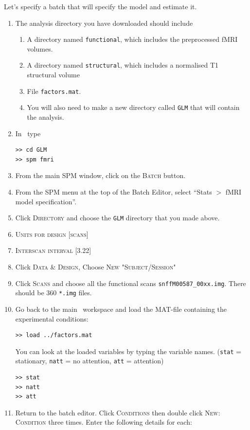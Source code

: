 Let's specify a batch that will specify the model and estimate it.

\begin{enumerate}
 \item The analysis directory you have downloaded should include
 \begin{enumerate}
  \item A directory named \texttt{functional}, which includes the preprocessed fMRI volumes.
  \item A directory named \texttt{structural}, which includes a normalised T1 structural volume
  \item File \texttt{factors.mat}.
  \item You will also need to make a new directory called \texttt{GLM} that will contain the analysis.
 \end{enumerate}
 \item In \matlab\ type
\begin{verbatim}
>> cd GLM
>> spm fmri
\end{verbatim}
 \item From the main SPM window, click on the \textsc{Batch} button.
 \item From the SPM menu at the top of the Batch Editor, select ``Stats $>$ fMRI model specification''.
 \item Click \textsc{Directory} and choose the \texttt{GLM} directory that you made above.
 \item \textsc{Units for design} [\textsc{scans}]
 \item \textsc{Interscan interval} [3.22]
 \item Click \textsc{Data \& Design}, Choose \textsc{New "Subject/Session"}
 \item Click \textsc{Scans} and choose all the functional scans \texttt{snffM00587\_00xx.img}. There should be 360 \texttt{*.img} files.
 \item Go back to the main \matlab\ workspace and load the MAT-file containing the experimental conditions:
\begin{verbatim}
>> load ../factors.mat
\end{verbatim}
You can look at the loaded variables by typing the variable names.
(\texttt{stat} = stationary, \texttt{natt} = no attention, \texttt{att} = attention)
\begin{verbatim}
>> stat
>> natt
>> att
\end{verbatim}
 \item Return to the batch editor. Click \textsc{Conditions} then double click \textsc{New: Condition} three times. Enter the following details for each:

\end{enumerate}
